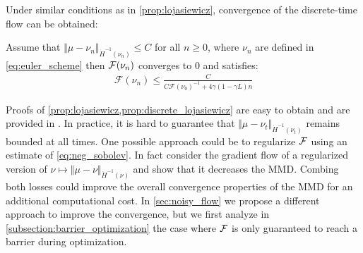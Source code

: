 Under similar conditions as in \cref{prop:lojasiewicz}, convergence of the discrete-time flow can be obtained:
\begin{proposition}\label{prop:discrete_lojasiewicz}
	Assume that $\Vert \mu - \nu_n \Vert_{\dot{H}^{-1}(\nu_n)} \leq C$ for all $n\geq 0$, where $\nu_n$ are defined in \cref{eq:euler_scheme} then ${{\mathcal F}}(\nu_n)$ converges to $0$ and satisfies:
	\begin{align}
	\mathcal{F}(\nu_n)\leq \frac{C}{C\mathcal{F}(\nu_0)^{-1} + 4 \gamma(1-\gamma L) n}
	\end{align}
\end{proposition}
Proofs of \cref{prop:lojasiewicz,prop:discrete_lojasiewicz} are easy to obtain and are provided in . 
In practice, it is hard to guarantee that $\Vert \mu - \nu_t \Vert_{\dot{H}^{-1}(\nu_t)} $ remains bounded at all times. One possible approach could be to regularize ${{\mathcal F}}$ using an estimate of \cref{eq:neg_sobolev}. In fact \cite{Mroueh:2019} consider the gradient flow of a regularized version of $ \nu \mapsto  \Vert \mu - \nu \Vert_{\dot{H}^{-1}(\nu)}$ and show that it decreases the MMD. Combing both losses could improve the overall convergence properties of the MMD for an additional computational cost. In \cref{sec:noisy_flow} we propose a different approach to improve the convergence, but we first analyze in \cref{subsection:barrier_optimization} the case where ${{\mathcal F}}$ is only guaranteed to reach a barrier during optimization.


 








